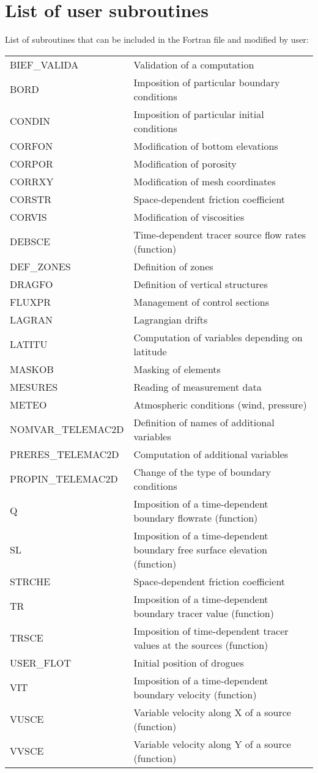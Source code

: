 \chapter{List of user subroutines}
\label{tel2d:app2}
List of subroutines that can be included in the Fortran file and modified by user:\\
\begin{tabular}{p{}p{4.0in}}
BIEF\_VALIDA &Validation of a computation\\
BORD &Imposition of particular boundary conditions\\
CONDIN &Imposition of particular initial conditions\\
CORFON &Modification of bottom elevations\\
CORPOR &Modification of porosity\\
CORRXY &Modification of mesh coordinates\\
CORSTR &Space-dependent friction coefficient\\
CORVIS &Modification of viscosities\\
DEBSCE &Time-dependent tracer source flow rates (function)\\
DEF\_ZONES &Definition of zones\\
DRAGFO &Definition of vertical structures\\
FLUXPR &Management of control sections\\
LAGRAN &Lagrangian drifts\\
LATITU &Computation of variables depending on latitude\\
MASKOB &Masking of elements\\
MESURES& Reading of measurement data\\
METEO &Atmospheric conditions (wind, pressure)\\
NOMVAR\_TELEMAC2D &Definition of names of additional variables\\
PRERES\_TELEMAC2D &Computation of additional variables\\
PROPIN\_TELEMAC2D &Change of the type of boundary conditions\\
Q &Imposition of a time-dependent boundary flowrate (function)\\
SL &Imposition of a time-dependent boundary free surface elevation (function)\\
STRCHE &Space-dependent friction coefficient\\
TR &Imposition of a time-dependent boundary tracer value (function)\\
TRSCE &Imposition of time-dependent tracer values at the sources (function)\\
USER\_FLOT &Initial position of drogues\\
VIT &Imposition of a time-dependent boundary velocity (function)\\
VUSCE &Variable velocity along X of a source (function)\\
VVSCE &Variable velocity along Y of a source (function)\\
\end{tabular}
 

